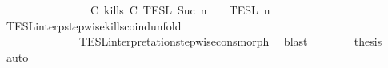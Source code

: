 \begin{isabellebody}
\ \ \ \ \ \ \ \ \ \ \ \ \ \ {\isasyminter}\ {\isasymlbrakk}\ {\isacharparenleft}C\ kills\ C\ {\isasymrbrakk}\isactrlsub T\isactrlsub E\isactrlsub S\isactrlsub L\isactrlbsup {\isasymge}\ Suc\ n\isactrlesup \ {\isasyminter}\ {\isasymlbrakk}{\isasymlbrakk}\ {\isasymPsi}\ {\isasymrbrakk}{\isasymrbrakk}\isactrlsub T\isactrlsub E\isactrlsub S\isactrlsub L\isactrlbsup {\isasymge}\ n\isactrlesup {\isacartoucheclose}\isanewline
\ \ \ \ \ \ \ \ \isamarkupfalse%
\ TESL{\isacharunderscore}interp{\isacharunderscore}stepwise{\isacharunderscore}kills{\isacharunderscore}coind{\isacharunderscore}unfold\isanewline
\ \ \ \ \ \ \ \ \ \ \ \ \ \ TESL{\isacharunderscore}interpretation{\isacharunderscore}stepwise{\isacharunderscore}cons{\isacharunderscore}morph\ \isamarkupfalse%
\ blast\isanewline
\ \ \ \ \ \ \isamarkupfalse%
\ {\isacharquery}thesis\ \isamarkupfalse%
\ auto\isanewline
\ \ \ \ \isamarkupfalse%
\isanewline
{}\isamarkupfalse%
%
\endisatagproof
{\isafoldproof}%
%
\isadelimproof
\isanewline
%
\endisadelimproof
%
\isadelimtheory
\isanewline
%
\endisadelimtheory
%
\isatagtheory
{}\isamarkupfalse%
%
\endisatagtheory
{\isafoldtheory}%
%
\isadelimtheory
%
\endisadelimtheory
%
\end{isabellebody}%
\endinput
